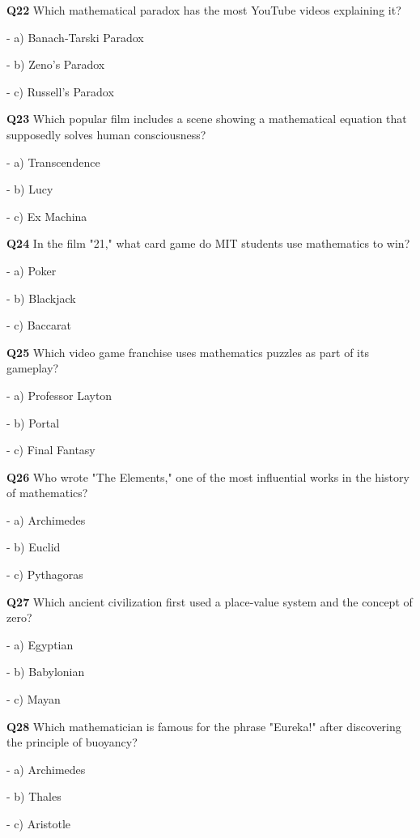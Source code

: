 \textbf{Q22} Which mathematical paradox has the most YouTube videos explaining it?\par
\quad - a) Banach‑Tarski Paradox\par
\quad - b) Zeno's Paradox\par
\quad - c) Russell's Paradox\par

\textbf{Q23} Which popular film includes a scene showing a mathematical equation that supposedly solves human consciousness?\par
\quad - a) Transcendence\par
\quad - b) Lucy\par
\quad - c) Ex Machina\par

\textbf{Q24} In the film "21," what card game do MIT students use mathematics to win?\par
\quad - a) Poker\par
\quad - b) Blackjack\par
\quad - c) Baccarat\par

\textbf{Q25} Which video game franchise uses mathematics puzzles as part of its gameplay?\par
\quad - a) Professor Layton\par
\quad - b) Portal\par
\quad - c) Final Fantasy\par

\textbf{Q26} Who wrote "The Elements," one of the most influential works in the history of mathematics?\par
\quad - a) Archimedes\par
\quad - b) Euclid\par
\quad - c) Pythagoras\par

\textbf{Q27} Which ancient civilization first used a place‑value system and the concept of zero?\par
\quad - a) Egyptian\par
\quad - b) Babylonian\par
\quad - c) Mayan\par

\textbf{Q28} Which mathematician is famous for the phrase "Eureka!" after discovering the principle of buoyancy?\par
\quad - a) Archimedes\par
\quad - b) Thales\par
\quad - c) Aristotle\par

